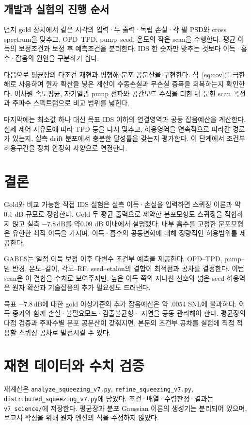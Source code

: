 \documentclass[11pt,a4paper]{article}
\newcommand{\dB}{\,\mathrm{dB}}
\newcommand{\code}[1]{\nolinkurl{#1}}
\begin{document}
\subsection{개발과 실험의 진행 순서}
먼저 gold 장치에서 같은 시각의 입력·두 출력·독립 손실·각 팔 PSD와
cross spectrum을 맞추고, OPD--TPD, pump--seed, 온도의 작은 scan을
수행한다. 평균 이득의 보정조건과 보정 후 예측조건을 분리한다.
IDS 한 숫자만 맞추는 것보다 이득·흡수·잡음의 원인을 구분하기 쉽다.

다음으로 평균장의 다조건 재현과 병행해 분포 공분산을 구현한다.
식~\eqref{eq:cov}를 극한해로 사용하여 원자 확산을 넣은 계산이 수동손실과
무손실 증폭을 회복하는지 확인한다. 이차원 속도평균, 자기일관 pump 전파와
공간모드 수집을 더한 뒤 문헌 scan 곡선과 주파수 스펙트럼으로 비교 범위를 넓힌다.

마지막에는 최소값 하나 대신 목표 IDS 이하의 연결영역과 공동 잡음예산을
계산한다. 실제 제어 자유도에 따라 TPD 등을 다시 맞추고, 허용영역을
연속적으로 따라갈 경로가 있는지, 실측 drift 분포에서 충분한 달성률을
갖는지 평가한다. 이 단계에서 조건부 허용구간을 장치 안정화 사양으로 연결한다.

\section{결론}
Gold와 비교 가능한 직접 IDS 실험은 실측 이득·손실을 입력하면
스퀴징 이론과 약0.1 dB 규모로 정합한다. Gold 두 평균 출력으로 제약한
분포모형도 스퀴징을 적합하지 않고 실측 $-7.8\dB$를 약0.09 dB 이내에서
설명했다. 내부 흡수를 고정한 분포모형은 유한한 최적 이득을 가지며,
이득·흡수의 공동변화에 대해 정량적인 허용범위를 제공한다.

GABES는 일점 이득 보정 이후 다변수 조건부 예측을 제공한다.
OPD--TPD, pump--빔 반경, 온도--길이, 각도--RF, seed--etalon의
결합이 최적점과 공차를 결정한다. 이번 scan은 이 결합을 수치로 보여주지만,
높은 이득 쪽의 지나친 선호와 넓은 seed 허용역은 원자 확산과 기술잡음의
추가 필요성도 드러낸다.

목표 $-7.8\dB$에 대한 gold 이상기준의 추가 잡음예산은 약
$.0054$ SNL에 불과하다. 이득 증가와 함께 손실·불필요모드·검출불균형·
지연을 공동 관리해야 한다. 평균장의 다점 검증과 주파수별 분포 공분산이
갖춰지면, 본문의 조건부 공차를 실험에 직접 적용할 스퀴징 공차로 발전시킬 수 있다.

\clearpage
\appendix
\section{재현 데이터와 수치 검증}
재계산은 \code{analyze_squeezing_v7.py},
\code{refine_squeezing_v7.py}, \code{distributed_squeezing_v7.py}에 담았다.
조건·배열·수렴판정·결과는 \code{v7_science/}에 저장한다.
평균장과 분포 Gaussian 이론의 생성기는 분리되어 있으며, 보고서 작성을
위해 원자 엔진의 식을 수정하지 않았다.
\end{document}
